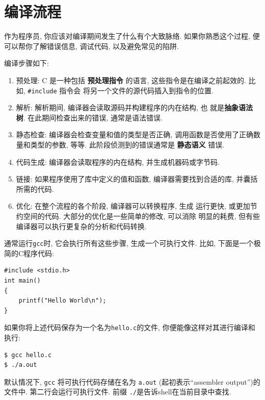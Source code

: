 \documentclass[12pt]{book}
\begin{document}
{\section{编译流程}

作为程序员, 你应该对编译期间发生了什么有个大致脉络.
如果你熟悉这个过程, 便可以帮你了解错误信息, 调试代码, 
以及避免常见的陷阱.


编译步骤如下:

\begin{enumerate}

\item 预处理: C 是一种包括 {\bf 预处理指令} 的语言, 
  这些指令是在编译之前起效的. 比如, \verb"#include" 指令会
  将另一个文件的源代码插入到指令的位置.

\item 解析: 解析期间, 编译器会读取源码并构建程序的内在结构, 也
  就是{\bf 抽象语法树}. 在此期间检查出来的错误, 通常是语法错误.

\item 静态检查: 编译器会检查变量和值的类型是否正确, 
  调用函数是否使用了正确数量和类型的参数, 等等.
  此阶段侦测到的错误通常是 {\bf 静态语义} 错误.

\item 代码生成: 编译器会读取程序的内在结构, 
  并生成机器码或字节码.

\item 链接: 如果程序使用了库中定义的值和函数, 
  编译器需要找到合适的库, 并囊括所需的代码.

\item 优化: 在整个流程的各个阶段, 编译器可以转换程序, 生成
  运行更快, 或更加节约空间的代码. 大部分的优化是一些简单的修改, 可以消除
  明显的耗费, 但有些编译器可以执行更复杂的分析和代码转换.

\end{enumerate}

通常运行{\tt gcc}时, 它会执行所有这些步骤, 生成一个可执行文件.
比如, 下面是一个极简的C程序代码:

\begin{verbatim}
#include <stdio.h>
int main()
{
    printf("Hello World\n");
}
\end{verbatim}

如果你将上述代码保存为一个名为{\tt hello.c}的文件, 
你便能像这样对其进行编译和执行:

\begin{verbatim}
$ gcc hello.c
$ ./a.out
\end{verbatim}

默认情况下, {\tt gcc} 将可执行代码存储在名为 {\tt a.out}
(起初表示``assembler output'')的文件中.
第二行会运行可执行文件. 
前缀 \verb"./"是告诉shell在当前目录中查找.

}
\end{document}
